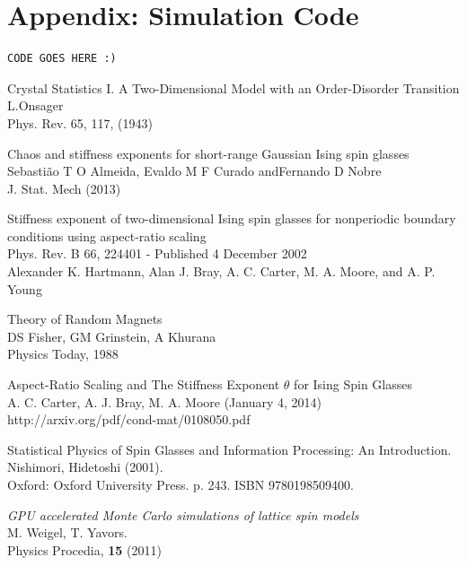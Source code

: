 \documentclass[paper=a4, fontsize=11pt]{scrartcl} %
\numberwithin{equation}{section} %
\numberwithin{figure}{section} %
\numberwithin{table}{section} %
\begin{document}
\pagebreak

\section*{Appendix: Simulation Code}
\begin{lstlisting}
CODE GOES HERE :)
\end{lstlisting}

\pagebreak

\begin{thebibliography}{100}

Crystal Statistics I. A Two-Dimensional Model with an Order-Disorder Transition \\
L.Onsager \\
Phys. Rev. 65, 117, (1943)

Chaos and stiffness exponents for short-range Gaussian Ising spin glasses \\
Sebasti\~{a}o T O Almeida, Evaldo M F Curado andFernando D Nobre \\
J. Stat. Mech (2013)

Stiffness exponent of two-dimensional Ising spin glasses for nonperiodic boundary conditions using aspect-ratio scaling \\
Phys. Rev. B 66, 224401 - Published 4 December 2002 \\
Alexander K. Hartmann, Alan J. Bray, A. C. Carter, M. A. Moore, and A. P. Young

Theory of Random Magnets \\
DS Fisher, GM Grinstein, A Khurana \\
Physics Today, 1988 

Aspect-Ratio Scaling and The Stiffness Exponent $\theta$ for Ising Spin Glasses \\
A. C. Carter, A. J. Bray, M. A. Moore (January 4, 2014) \\
http://arxiv.org/pdf/cond-mat/0108050.pdf

Statistical Physics of Spin Glasses and Information Processing: An Introduction. \\
Nishimori, Hidetoshi (2001). \\
Oxford: Oxford University Press. p. 243. ISBN 9780198509400.

\textit{GPU accelerated Monte Carlo simulations of lattice spin models} \\
M. Weigel, T. Yavors. \\
Physics Procedia, \textbf{15} (2011)

\end{thebibliography}
\end{document}
